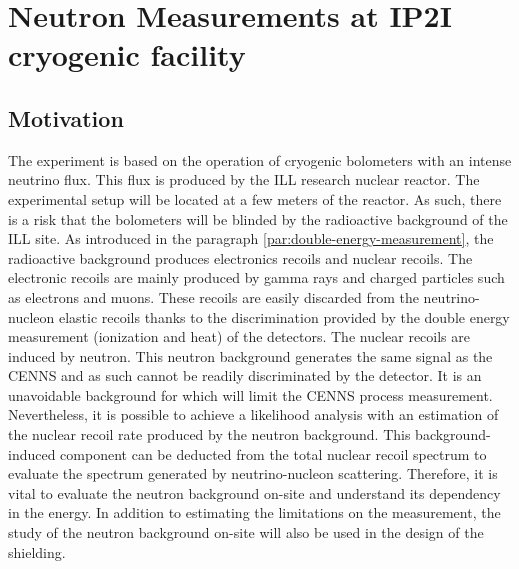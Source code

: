 
\chapter{Neutron Measurements at IP2I cryogenic facility} %

\label{ChapterNeutron} %



\section{Motivation}

The \Ricochet{} experiment is based on the operation of cryogenic bolometers with an intense neutrino flux. This flux is produced by the ILL research nuclear reactor. The \Ricochet{} experimental setup will be located at a few meters of the reactor. As such, there is a risk that the bolometers will be blinded by the radioactive background of the ILL site.
As introduced in the paragraph \ref{par:double-energy-measurement}, the radioactive background produces electronics recoils and nuclear recoils. 
The electronic recoils are mainly produced by gamma rays and charged particles such as electrons and muons. These recoils are easily discarded from the neutrino-nucleon elastic recoils thanks to the discrimination provided by the double energy measurement (ionization and heat) of the detectors.
The nuclear recoils are induced by neutron. This neutron background generates the same signal as the CENNS and as such cannot be readily discriminated by the detector. It is an unavoidable background for \Ricochet{} which will limit the CENNS process measurement.
Nevertheless, it is possible to achieve a likelihood analysis with an estimation of the nuclear recoil rate produced by the neutron background. This background-induced component can be deducted from the total nuclear recoil spectrum to evaluate the spectrum generated by neutrino-nucleon scattering. 
Therefore, it is vital to evaluate the neutron background on-site and understand its dependency in the energy.
In addition to estimating the limitations on the measurement, the study of the neutron background on-site will also be used in the design of the shielding.

